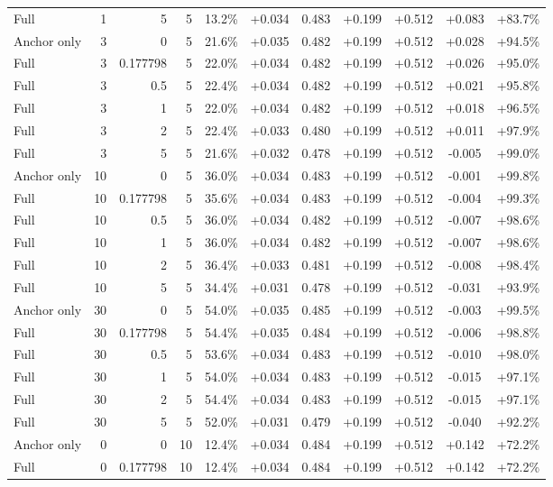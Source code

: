 \begin{table}[htbp]
\begin{tabular}{lrrrccccccc}
Full & 1 & 5 & 5 & 13.2\% & +0.034 & 0.483 & +0.199 & +0.512 & +0.083 & +83.7\% \\
Anchor only & 3 & 0 & 5 & 21.6\% & +0.035 & 0.482 & +0.199 & +0.512 & +0.028 & +94.5\% \\
Full & 3 & 0.177798 & 5 & 22.0\% & +0.034 & 0.482 & +0.199 & +0.512 & +0.026 & +95.0\% \\
Full & 3 & 0.5 & 5 & 22.4\% & +0.034 & 0.482 & +0.199 & +0.512 & +0.021 & +95.8\% \\
Full & 3 & 1 & 5 & 22.0\% & +0.034 & 0.482 & +0.199 & +0.512 & +0.018 & +96.5\% \\
Full & 3 & 2 & 5 & 22.4\% & +0.033 & 0.480 & +0.199 & +0.512 & +0.011 & +97.9\% \\
Full & 3 & 5 & 5 & 21.6\% & +0.032 & 0.478 & +0.199 & +0.512 & -0.005 & +99.0\% \\
Anchor only & 10 & 0 & 5 & 36.0\% & +0.034 & 0.483 & +0.199 & +0.512 & -0.001 & +99.8\% \\
Full & 10 & 0.177798 & 5 & 35.6\% & +0.034 & 0.483 & +0.199 & +0.512 & -0.004 & +99.3\% \\
Full & 10 & 0.5 & 5 & 36.0\% & +0.034 & 0.482 & +0.199 & +0.512 & -0.007 & +98.6\% \\
Full & 10 & 1 & 5 & 36.0\% & +0.034 & 0.482 & +0.199 & +0.512 & -0.007 & +98.6\% \\
Full & 10 & 2 & 5 & 36.4\% & +0.033 & 0.481 & +0.199 & +0.512 & -0.008 & +98.4\% \\
Full & 10 & 5 & 5 & 34.4\% & +0.031 & 0.478 & +0.199 & +0.512 & -0.031 & +93.9\% \\
Anchor only & 30 & 0 & 5 & 54.0\% & +0.035 & 0.485 & +0.199 & +0.512 & -0.003 & +99.5\% \\
Full & 30 & 0.177798 & 5 & 54.4\% & +0.035 & 0.484 & +0.199 & +0.512 & -0.006 & +98.8\% \\
Full & 30 & 0.5 & 5 & 53.6\% & +0.034 & 0.483 & +0.199 & +0.512 & -0.010 & +98.0\% \\
Full & 30 & 1 & 5 & 54.0\% & +0.034 & 0.483 & +0.199 & +0.512 & -0.015 & +97.1\% \\
Full & 30 & 2 & 5 & 54.4\% & +0.034 & 0.483 & +0.199 & +0.512 & -0.015 & +97.1\% \\
Full & 30 & 5 & 5 & 52.0\% & +0.031 & 0.479 & +0.199 & +0.512 & -0.040 & +92.2\% \\
Anchor only & 0 & 0 & 10 & 12.4\% & +0.034 & 0.484 & +0.199 & +0.512 & +0.142 & +72.2\% \\
Full & 0 & 0.177798 & 10 & 12.4\% & +0.034 & 0.484 & +0.199 & +0.512 & +0.142 & +72.2\% \\

\end{tabular}
\end{table}

